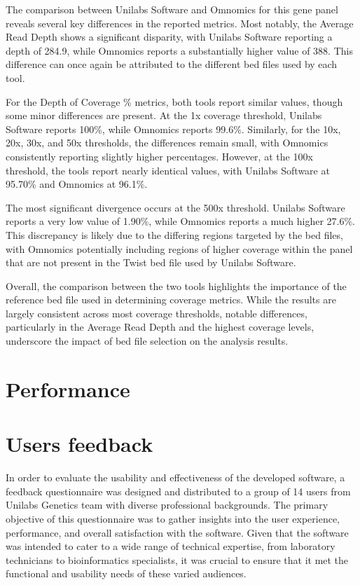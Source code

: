 The comparison between Unilabs Software and Omnomics for this gene panel reveals several key differences in the reported metrics. Most notably, the Average Read Depth shows a significant disparity, with Unilabs Software reporting a depth of 284.9, while Omnomics reports a substantially higher value of 388. This difference can once again be attributed to the different \ac{bed} files used by each tool.

For the Depth of Coverage \% metrics, both tools report similar values, though some minor differences are present. At the 1x coverage threshold, Unilabs Software reports 100\%, while Omnomics reports 99.6\%. Similarly, for the 10x, 20x, 30x, and 50x thresholds, the differences remain small, with Omnomics consistently reporting slightly higher percentages. However, at the 100x threshold, the tools report nearly identical values, with Unilabs Software at 95.70\% and Omnomics at 96.1\%.

The most significant divergence occurs at the 500x threshold. Unilabs Software reports a very low value of 1.90\%, while Omnomics reports a much higher 27.6\%. This discrepancy is likely due to the differing regions targeted by the \ac{bed} files, with Omnomics potentially including regions of higher coverage within the panel that are not present in the Twist \ac{bed} file used by Unilabs Software.

Overall, the comparison between the two tools highlights the importance of the reference \ac{bed} file used in determining coverage metrics. While the results are largely consistent across most coverage thresholds, notable differences, particularly in the Average Read Depth and the highest coverage levels, underscore the impact of \ac{bed} file selection on the analysis results.

\section{Performance}


\section{Users feedback}

In order to evaluate the usability and effectiveness of the developed software, a feedback questionnaire was designed and distributed to a group of 14 users from Unilabs Genetics team with diverse professional backgrounds. The primary objective of this questionnaire was to gather insights into the user experience, performance, and overall satisfaction with the software. Given that the software was intended to cater to a wide range of technical expertise, from laboratory technicians to bioinformatics specialists, it was crucial to ensure that it met the functional and usability needs of these varied audiences.

